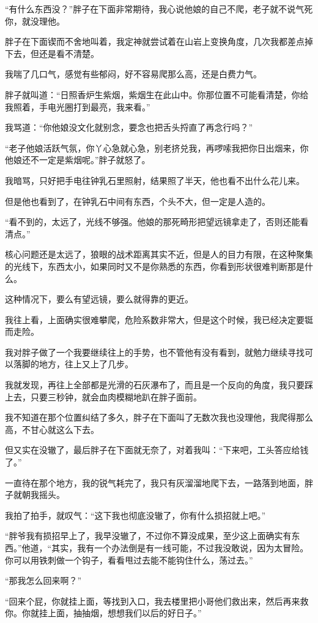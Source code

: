 “有什么东西没？”胖子在下面非常期待，我心说他娘的自己不爬，老子就不说气死你，就没理他。

胖子在下面锲而不舍地叫着，我定神就尝试着在山岩上变换角度，几次我都差点掉下去，但还是看不清楚。

我喘了几口气，感觉有些郁闷，好不容易爬那么高，还是白费力气。

胖子就叫道：“日照香炉生紫烟，紫烟生在此山中。你那位置不可能看清楚，你给我照着，手电光圈打到最亮，我来看。”

我骂道：“你他娘没文化就别念，要念也把舌头捋直了再念行吗？”

“老子他娘活跃气氛，你丫心急就心急，别老挤兑我，再啰嗦我把你日出烟来，你他娘还不一定是紫烟呢。”胖子就怒了。

我暗骂，只好把手电往钟乳石里照射，结果照了半天，他也看不出什么花儿来。

但是他也看到了，在钟乳石中间有东西，个头不大，但一定是人造的。

“看不到的，太远了，光线不够强。他娘的那死畸形把望远镜拿走了，否则还能看清点。”

核心问题还是太远了，狼眼的战术距离其实不近，但是人的目力有限，在这种聚集的光线下，东西太小，如果同时又不是你熟悉的东西，你看到形状很难判断那是什么。

这种情况下，要么有望远镜，要么就得靠的更近。

我往上看，上面确实很难攀爬，危险系数非常大，但是这个时候，我已经决定要铤而走险。

我对胖子做了一个我要继续往上的手势，也不管他有没有看到，就勉力继续寻找可以落脚的地方，往上又上了几步。

我就发现，再往上全部都是光滑的石灰瀑布了，而且是一个反向的角度，我只要踩上去，只要三秒钟，就会血肉模糊地趴在胖子面前。

我不知道在那个位置纠结了多久，胖子在下面叫了无数次我也没理他，我爬得那么高，不甘心就这么下去。

但又实在没辙了，最后胖子在下面就无奈了，对着我叫：“下来吧，工头答应给钱了。”

一直待在那个地方，我的锐气耗完了，我只有灰溜溜地爬下去，一路落到地面，胖子就朝我摇头。

我拍了拍手，就叹气：“这下我也彻底没辙了，你有什么损招就上吧。”

“胖爷我有损招早上了，我早没辙了，不过你不算没成果，至少这上面确实有东西。”他道，“其实，我有一个办法倒是有一线可能，不过我没敢说，因为太冒险。你可以用铁刺做一个钩子，看看甩过去能不能钩住什么，荡过去。”

“那我怎么回来啊？”

“回来个屁，你就挂上面，等找到入口，我去楼里把小哥他们救出来，然后再来救你。你就挂上面，抽抽烟，想想我们以后的好日子。”

